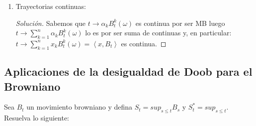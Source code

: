 \documentclass[11pt,notitlepage]{article}
\newenvironment{solucion}
  {\begin{proof}[Solución]}
  {\end{proof}}
\begin{document}
\begin{enumerate}
    \begin{solucion}
     Note que
    \[
    X_t - X_s = \left \langle x,B_t - B_s \right \rangle = \sum_{k=1}^{n}x_k\left(B_{t}^{k} - B_{s}^{k}\right)
    \]
    Sea \(Y_k = B_{t}^{k} - B_{s}^{k}\), para \(k = 1,\hdots,n\) observemos que \(Y_1 \perp Y_2 \hdots  \perp Y_k\) y \(Y_k\sim N(0,t-s)\),
    de lo cual se sigue: 
    \begin{equation}\label{1.3.1}
      \sum_{k=1}^{n}x_kY_k \sim N(0,x_{1}^{2}(t-s) + \hdots x_{r}^{2}(t-s))
    \end{equation}
    y como \(\left \| x \right \|_2 = 1\) entonces \(\sum_{k=1}^{n}x_{k}^{2} = 1\) y, por esto y por (\ref{1.3.1}) se tiene que:
    \[X_t - X_s \sim N(0,t-s)\]
    Lo que implica también que:
    \[X_t - X_s \sim X_{t+h} - X_{s+h}, \ \ \forall 0\leq s\leq t, \ \ t\geq -s \]
    \end{solucion}
    \item Trayectorias continuas: 
    \begin{solucion}
    Sabemos que \(t \rightarrow \alpha_kB_{t}^{k}(\omega)\) es continua por ser MB luego  \(t \rightarrow\sum_{k=1}^{n}\alpha_kB_{t}^{k}(\omega)\)
    lo es por ser suma de continuas y, en particular: 
    \(t \rightarrow\sum_{k=1}^{n}x_kB_{t}^{k}(\omega) = \left \langle x,B_t \right \rangle\) es continua.
    \end{solucion}
\end{enumerate}
\subsection{Aplicaciones de la desigualdad de Doob para el Browniano}
Sea \(B_t\) un movimiento browniano y defina \(S_t=sup_{s\leq t}B_s\) y \(S^*_t=sup_{s\leq t}\).
Resuelva lo siguiente:
\end{document}
